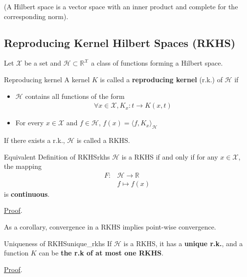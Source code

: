 \documentclass[10pt]{article}
\begin{document}
(A Hilbert space is a vector space with an inner product and complete for the 
corresponding norm).

\subsection{Reproducing Kernel Hilbert Spaces (RKHS)}

Let $\mathcal{X}$ be a set and $\mathcal{H} \subset \mathbb{R}^\mathcal{X}$ a 
class of functions forming a Hilbert space. 
\begin{Definition}{Reproducing kernel}{}
    A kernel $K$ is called a \textbf{reproducing kernel} (r.k.) of $\mathcal{H}$ 
    if 
    \begin{itemize}
        \item $\mathcal{H}$ contains all functions of the form 
        \begin{align*}
           \boxed{\forall x \in \mathcal{X}, K_x: t \rightarrow K(x, t)}
        \end{align*}
        \item For every $x \in \mathcal{X}$ and $f\in \mathcal{H}$, 
        $\boxed{f(x) = \langle f, K_x \rangle_\mathcal{H} }$
    \end{itemize}
\end{Definition}

If there exists a r.k., $\mathcal{H}$ is called a RKHS.

\begin{Theorem}{Equivalent Definition of RKHS}{rkhs}
    $\mathcal{H}$ is a RKHS if and only if for any $x\in\mathcal{X}$, the 
    mapping
    \begin{align*}
        F: & \mathcal{H}\rightarrow \mathbb{R}\\
        & f \mapsto f(x)
    \end{align*}
    is \textbf{continuous}.
    \par \hfill \hyperref[prf:rkhs]{\small Proof}.
\end{Theorem}


As a corollary, convergence in a RKHS implies point-wise convergence.


\begin{Theorem}{Uniqueness of RKHS}{unique_rkhs}
  If $\mathcal{H}$ is a RKHS, it has a \textbf{unique r.k.}, and a function $K$
  can be \textbf{the r.k of at most one RKHS}.
  \par \hfill \hyperref[prf:unique_rkhs]{\small Proof}.
\end{Theorem}
\end{document}
